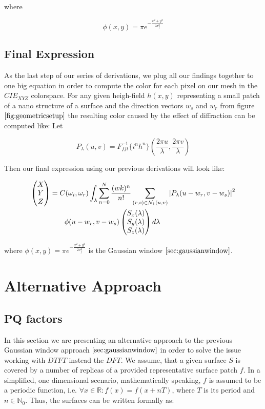 where 

\begin{equation} \label{eq:gaussweight}
 \phi(x,y) = \pi e^{-\frac{x^2 + y^2}{2\sigma_{f}^2}}
\end{equation} 

\subsection{Final Expression}
As the last step of our series of derivations, we plug all our findings together to one big equation in order to compute the color for each pixel on our mesh in the $CIE_{XYZ}$ colorspace. For any given heigh-field $h(x,y)$ representing a small patch of a nano structure of a surface and the direction vectors $w_s$ and $w_r$ from figure $\ref{fig:geometricsetup}$ the resulting color caused by the effect of diffraction can be computed like: Let 

\begin{equation}
P_{\lambda}(u,v) = {F}_{fft}^{-1}\{i^n h^n\}(\frac{2\pi u}{\lambda},\frac{2\pi v}{\lambda})
\end{equation}

Then our final expression using our previous derivations will look like:

\begin{equation}
\begin{split}
\colvec[X]{Y}{Z}& = C(\omega_i,\omega_r) \int_{\lambda} \sum_{n=0}^N  \frac{(wk)^n}{n!} \sum_{(r,s) \in \mathcal{N}_1(u,v)} \left| P_{\lambda}(u-w_r,v-w_s) \right|^2 \\
& \quad \quad  \phi(u-w_r, v-w_s) \colvec[S_x(\lambda)]{S_y(\lambda)}{S_z(\lambda)}d\lambda
\end{split}
\label{eq:finalexpression}
\end{equation}

where $\phi(x,y) = \pi e^{-\frac{x^2 + y^2}{2\sigma_{f}^2}}$ is the Gaussian window $\ref{sec:gaussianwindow}$.

\section{Alternative Approach}
\subsection{PQ factors}
\label{sec:pq}
In this section we are presenting an alternative approach to the previous Gaussian window approach 
$\ref{sec:gaussianwindow}$ 
in order to solve the issue working with $DTFT$ instead the $DFT$. We assume, that a given surface $S$ is covered by a number of replicas of a provided representative surface patch $f$. In a simplified, one dimensional scenario, mathematically speaking, $f$ is assumed to be a periodic function, i.e. $\forall x \in \mathds{R} : f(x) = f(x+nT)$, where $T$ is its period and $n \in \mathds{N}_{0}$. Thus, the surfaces can be written formally as:

